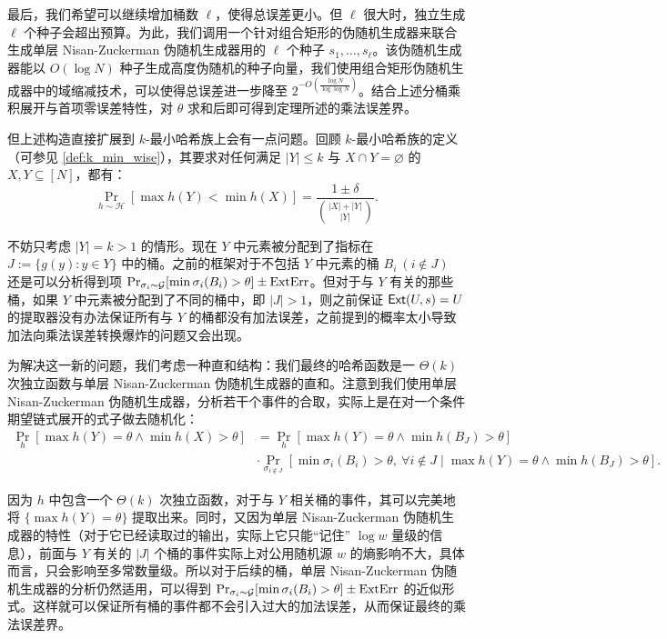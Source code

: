 最后，我们希望可以继续增加桶数 $\ell$，使得总误差更小。但 $\ell$ 很大时，独立生成 $\ell$ 个种子会超出预算。为此，我们调用一个针对组合矩形的伪随机生成器来联合生成单层 Nisan-Zuckerman 伪随机生成器用的 $\ell$ 个种子 $s_1, \ldots, s_\ell$。该伪随机生成器能以 $O(\log N)$ 种子生成高度伪随机的种子向量，我们使用组合矩形伪随机生成器中的域缩减技术，可以使得总误差进一步降至 $2^{-O\left(\frac{\log N}{\log \log N}\right)}$。结合上述分桶乘积展开与首项零误差特性，对 $\theta$ 求和后即可得到定理所述的乘法误差界。

但上述构造直接扩展到 $k$-最小哈希族上会有一点问题。回顾 $k$-最小哈希族的定义（可参见 \cref{def:k_min_wise}），其要求对任何满足 $|Y| \le k$ 与 $X \cap Y = \varnothing$ 的 $X, Y \subseteq [N]$，都有：
$$
\Pr_{h \sim \mathcal{H}}[\max h(Y) < \min h(X)] = \frac{1 \pm \delta}{\binom{|X| + |Y|}{|Y|}}.
$$

不妨只考虑 $|Y| = k > 1$ 的情形。现在 $Y$ 中元素被分配到了指标在 $J := \{g(y) : y \in Y\}$ 中的桶。之前的框架对于不包括 $Y$ 中元素的桶 $B_i\ (i \notin J)$ 还是可以分析得到项 $\Pr_{\sigma_i \sim \mathcal{G}}[\min \sigma_i(B_i) > \theta] \pm \mathrm{ExtErr}$。但对于与 $Y$ 有关的那些桶，如果 $Y$ 中元素被分配到了不同的桶中，即 $|J| > 1$，则之前保证 $\mathsf{Ext}(U, s) = U$ 的提取器没有办法保证所有与 $Y$ 的桶都没有加法误差，之前提到的概率太小导致加法向乘法误差转换爆炸的问题又会出现。

为解决这一新的问题，我们考虑一种直和结构：我们最终的哈希函数是一 $\Theta(k)$ 次独立函数与单层 Nisan-Zuckerman 伪随机生成器的直和。注意到我们使用单层 Nisan-Zuckerman 伪随机生成器，分析若干个事件的合取，实际上是在对一个条件期望链式展开的式子做去随机化：
\begin{align*}
    \Pr_h[\max h(Y) = \theta \wedge \min h(X) > \theta] & =  \Pr_h[ \max h(Y) = \theta \wedge \min h(B_J) > \theta ] \\
     & \cdot \Pr_{\sigma_{i \notin J}}[\min \sigma_i(B_i) > \theta,\ \forall i \notin J \mid \max h(Y) = \theta \wedge \min h(B_J) > \theta].
\end{align*}

因为 $h$ 中包含一个 $\Theta(k)$ 次独立函数，对于与 $Y$ 相关桶的事件，其可以完美地将 $\{\max h(Y) = \theta\}$ 提取出来。同时，又因为单层 Nisan-Zuckerman 伪随机生成器的特性（对于它已经读取过的输出，实际上它只能“记住” $\log w$ 量级的信息），前面与 $Y$ 有关的 $|J|$ 个桶的事件实际上对公用随机源 $w$ 的熵影响不大，具体而言，只会影响至多常数量级。所以对于后续的桶，单层 Nisan-Zuckerman 伪随机生成器的分析仍然适用，可以得到 $\Pr_{\sigma_i \sim \mathcal{G}}[\min \sigma_i(B_i) > \theta] \pm \mathrm{ExtErr}$ 的近似形式。这样就可以保证所有桶的事件都不会引入过大的加法误差，从而保证最终的乘法误差界。

